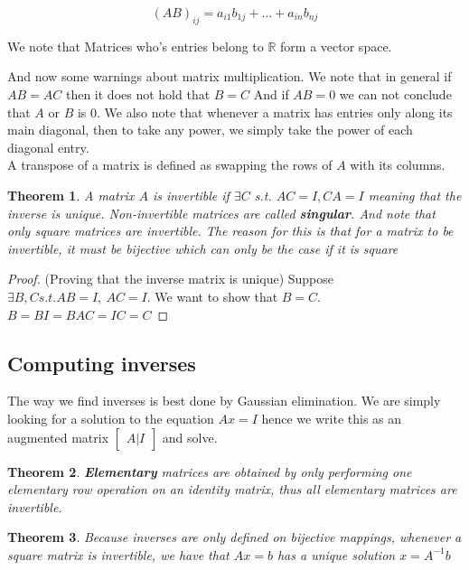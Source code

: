 \documentclass{article}
\newtheorem{thm}{Theorem}[subsection]
\numberwithin{equation}{subsection}
\begin{document}
$$(AB)_{ij} = a_{i1}b_{1j} + \ldots + a_{in}b_{nj}$$

\begin{remark}
We note that Matrices who's entries belong to $\mathbb{R}$ form a vector space.
\end{remark}

And now some warnings about matrix multiplication. We note that in general if $AB = AC$ then it does not hold that $B=C$ And if $AB=0$ we can not conclude that $A$ or $B$ is $0$. We also note that whenever a matrix has entries only along its main diagonal, then to take any power, we simply take the power of each diagonal entry. 
\\
A transpose of a matrix is defined as swapping the rows of $A$ with its columns. \\
\begin{thm}
A matrix $A$ is invertible if $\exists C$ s.t. $AC = I , CA=I$ meaning that the inverse is unique. Non-invertible matrices are called \textbf{singular}. And note that only square matrices are invertible. The reason for this is that for a matrix to be invertible, it must be bijective which can only be the case if it is square 
\end{thm}

\begin{proof}(Proving that the inverse matrix is unique)
Suppose $\exists B,C s.t. AB = I, \ AC=I$. We want to show that $B = C$.
\\
$B = BI = BAC = IC = C$
\end{proof}


\subsection{Computing inverses}

The way we find inverses is best done by Gaussian elimination. We are simply looking for a solution to the equation $Ax=I$ hence we write this as an augmented matrix $\begin{bmatrix}
    A | I
\end{bmatrix}$ and solve. 

\begin{thm}
\textbf{Elementary} matrices are obtained by only performing one elementary row operation on an identity matrix, thus all elementary matrices are invertible.
\end{thm}

\begin{thm}
Because inverses are only defined on bijective mappings, whenever a square matrix is invertible, we have that $Ax=b$ has a unique solution $x = A^{-1}b$
\end{thm}
\end{document}
